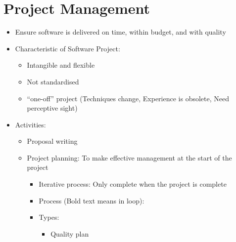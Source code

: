 \documentclass[12pt,openany]{book}
\begin{document}
\section{Project Management}
\begin{itemize}
    \item Ensure software is delivered on time, within budget, and with quality
    \item Characteristic of Software Project:
    \begin{itemize}
        \item Intangible and flexible
        \item Not standardised
        \item ``one-off'' project (Techniques change, Experience is obsolete, Need perceptive sight)
    \end{itemize}
    \item Activities:
    \begin{itemize}
        \item Proposal writing
        \item Project planning: To make effective management at the start of the project
        \begin{itemize}
            \item Iterative process: Only complete when the project is complete
            \item Process (Bold text means in loop):
            \item Types:
            \begin{itemize}
                \item Quality plan

\end{itemize}
\end{itemize}
\end{itemize}
\end{itemize}
\end{document}
